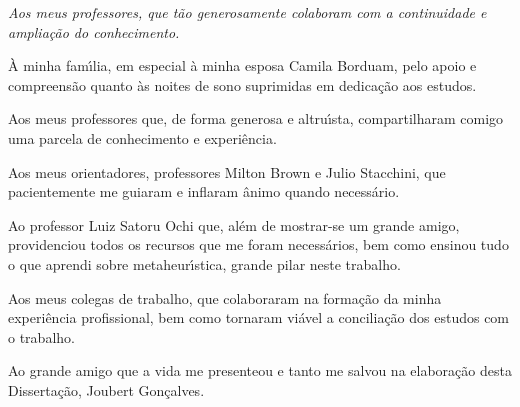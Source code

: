 
\cleardoublepage
\thispagestyle{empty}
\vspace*{200mm}

\begin{flushright}
{\em 
Aos meus professores, que t{\~a}o generosamente colaboram com a continuidade e amplia{\c c}{\~a}o do conhecimento.
}
\end{flushright}
\newpage


\hspace{5mm}
{\`A} minha fam{\'\i}lia, em especial {\`a} minha esposa Camila Borduam, pelo apoio e compreens{\~a}o quanto {\`a}s noites de sono suprimidas em dedica{\c c}{\~a}o aos estudos.

Aos meus professores que, de forma generosa e altru{\'\i}sta, compartilharam comigo uma parcela de conhecimento e experi{\^e}ncia.

Aos meus orientadores, professores Milton Brown e Julio Stacchini, que pacientemente me guiaram e inflaram {\^a}nimo quando necess{\'a}rio.

Ao professor Luiz Satoru Ochi que, al{\'e}m de mostrar-se um grande amigo, providenciou todos os recursos que me foram necess{\'a}rios, bem como ensinou tudo o que aprendi sobre metaheur{\'\i}stica, grande pilar neste trabalho.

Aos meus colegas de trabalho, que colaboraram na forma{\c c}{\~a}o da minha experi{\^e}ncia profissional, bem como tornaram vi{\'a}vel a concilia{\c c}{\~a}o dos estudos com o trabalho.

Ao grande amigo que a vida me presenteou e tanto me salvou na elabora{\c c}{\~a}o desta Disserta{\c c}{\~a}o, Joubert Gon{\c c}alves.

